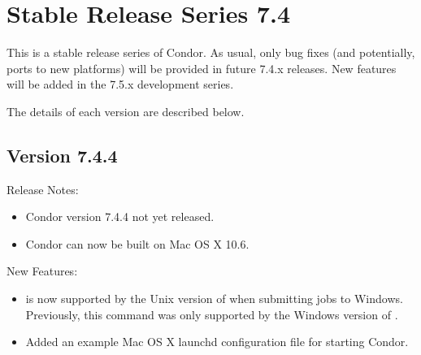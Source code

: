 
\section{\label{sec:History-7-4}Stable Release Series 7.4}

This is a stable release series of Condor.
As usual, only bug fixes (and potentially, ports to new platforms)
will be provided in future 7.4.x releases.
New features will be added in the 7.5.x development series.

The details of each version are described below.

\subsection*{\label{sec:New-7-4-4}Version 7.4.4}

\noindent Release Notes:

\begin{itemize}

\item Condor version 7.4.4 not yet released.

\item Condor can now be built on Mac OS X 10.6.

\end{itemize}


\noindent New Features:

\begin{itemize}

\item {} is now supported by the Unix version of
 when submitting jobs to Windows.  Previously, this command
was only supported by the Windows version of .

\item Added an example Mac OS X launchd configuration file for starting Condor.

\end{itemize}

